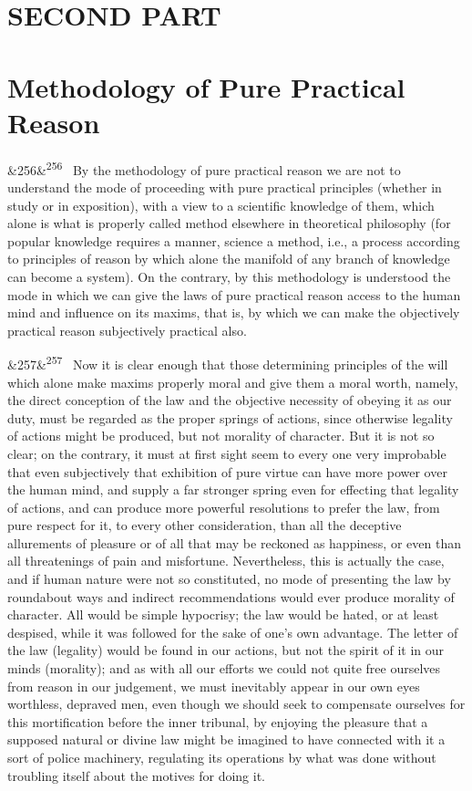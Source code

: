 \documentclass[12pt]{article}
\newcommand{\para}[1][]{\par\noindent\ifx&#1&\else\textsuperscript{\footnotesize #1}~\fi}
\begin{document}
\section*{SECOND PART}

\section*{Methodology of Pure Practical Reason}

\para[256] By the methodology of pure practical reason we are not to understand the mode of proceeding with pure practical principles (whether in study or in exposition), with a view to a scientific knowledge of them, which alone is what is properly called method elsewhere in theoretical philosophy (for popular knowledge requires a manner, science a method, i.e., a process according to principles of reason by which alone the manifold of any branch of knowledge can become a system). On the contrary, by this methodology is understood the mode in which we can give the laws of pure practical reason access to the human mind and influence on its maxims, that is, by which we can make the objectively practical reason subjectively practical also.

\para[257] Now it is clear enough that those determining principles of the will which alone make maxims properly moral and give them a moral worth, namely, the direct conception of the law and the objective necessity of obeying it as our duty, must be regarded as the proper springs of actions, since otherwise legality of actions might be produced, but not morality of character. But it is not so clear; on the contrary, it must at first sight seem to every one very improbable that even subjectively that exhibition of pure virtue can have more power over the human mind, and supply a far stronger spring even for effecting that legality of actions, and can produce more powerful resolutions to prefer the law, from pure respect for it, to every other consideration, than all the deceptive allurements of pleasure or of all that may be reckoned as happiness, or even than all threatenings of pain and misfortune. Nevertheless, this is actually the case, and if human nature were not so constituted, no mode of presenting the law by roundabout ways and indirect recommendations would ever produce morality of character. All would be simple hypocrisy; the law would be hated, or at least despised, while it was followed for the sake of one's own advantage. The letter of the law (legality) would be found in our actions, but not the spirit of it in our minds (morality); and as with all our efforts we could not quite free ourselves from reason in our judgement, we must inevitably appear in our own eyes worthless, depraved men, even though we should seek to compensate ourselves for this mortification before the inner tribunal, by enjoying the pleasure that a supposed natural or divine law might be imagined to have connected with it a sort of police machinery, regulating its operations by what was done without troubling itself about the motives for doing it.
\end{document}
